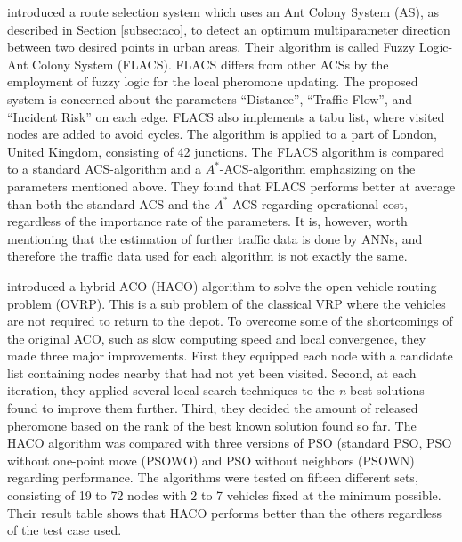 \citet{salehinejad10} introduced a route selection system which uses an Ant Colony System (AS), as described in Section \vref{subsec:aco}, to detect an optimum multiparameter direction between two desired points in urban areas. Their algorithm is called Fuzzy Logic-Ant Colony System (FLACS). FLACS differs from other ACSs by the employment of fuzzy logic for the local pheromone updating. The proposed system is concerned about the parameters ``Distance'', ``Traffic Flow'', and ``Incident Risk'' on each edge. FLACS also implements a tabu list, where visited nodes are added to avoid cycles. The algorithm is applied to a part of London, United Kingdom, consisting of 42 junctions. The FLACS algorithm is compared to a standard ACS-algorithm and a $A^*$-ACS-algorithm emphasizing on the parameters mentioned above. They found that FLACS performs better at average than both the standard ACS and the $A^*$-ACS regarding operational cost, regardless of the importance rate of the parameters. It is, however, worth mentioning that the estimation of further traffic data is done by ANNs, and therefore the traffic data used for each algorithm is not exactly the same.

\citet{sedighpour14} introduced a hybrid ACO (HACO) algorithm to solve the open vehicle routing problem (OVRP). This is a sub problem of the classical VRP where the vehicles are not required to return to the depot. To overcome some of the shortcomings of the original ACO, such as slow computing speed and local convergence, they made three major improvements. First they equipped each node with a candidate list containing nodes nearby that had not yet been visited. Second, at each iteration, they applied several local search techniques to the \textit{n} best solutions found to improve them further. Third, they decided the amount of released pheromone based on the rank of the best known solution found so far. The HACO algorithm was compared with three versions of PSO (standard PSO, PSO without one-point move (PSOWO) and PSO without neighbors (PSOWN) regarding performance. The algorithms were tested on fifteen different sets, consisting of 19 to 72 nodes with 2 to 7 vehicles fixed at the minimum possible. Their result table shows that HACO performs better than the others regardless of the test case used.
\newline


